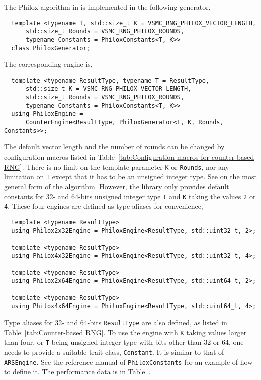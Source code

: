 The Philox algorithm in \textcite{Salmon:2011um} is implemented in the
following generator,
\begin{Verbatim}
  template <typename T, std::size_t K = VSMC_RNG_PHILOX_VECTOR_LENGTH,
      std::size_t Rounds = VSMC_RNG_PHILOX_ROUNDS,
      typename Constants = PhiloxConstants<T, K>>
  class PhiloxGenerator;
\end{Verbatim}
The corresponding \rng engine is,
\begin{Verbatim}
  template <typename ResultType, typename T = ResultType,
      std::size_t K = VSMC_RNG_PHILOX_VECTOR_LENGTH,
      std::size_t Rounds = VSMC_RNG_PHILOX_ROUNDS,
      typename Constants = PhiloxConstants<T, K>>
  using PhiloxEngine =
      CounterEngine<ResultType, PhiloxGenerator<T, K, Rounds, Constants>>;
\end{Verbatim}
The default vector length and the number of rounds can be changed by
configuration macros listed in Table~\ref{tab:Configuration macros for
  counter-based RNG}. There is no limit on the template parameter \verb|K| or
\verb|Rounds|, nor any limitation on \verb|T| except that it has to be an
unsigned integer type. See \textcite{Salmon:2011um} on the most general form of
the algorithm. However, the library only provides default constants for 32- and
64-bits unsigned integer type \verb|T| and \verb|K| taking the values \verb|2|
or \verb|4|. These four engines are defined as type aliases for convenience,
\begin{Verbatim}
  template <typename ResultType>
  using Philox2x32Engine = PhiloxEngine<ResultType, std::uint32_t, 2>;

  template <typename ResultType>
  using Philox4x32Engine = PhiloxEngine<ResultType, std::uint32_t, 4>;

  template <typename ResultType>
  using Philox2x64Engine = PhiloxEngine<ResultType, std::uint64_t, 2>;

  template <typename ResultType>
  using Philox4x64Engine = PhiloxEngine<ResultType, std::uint64_t, 4>;
\end{Verbatim}
Type aliases for 32- and 64-bits \verb|ResultType| are also defined, as listed
in Table~\ref{tab:Counter-based RNG}. To use the engine with \verb|K| taking
values larger than four, or \verb|T| being unsigned integer type with bits
other than 32 or 64, one needs to provide a suitable trait class,
\verb|Constant|. It is similar to that of \verb|ARSEngine|. See the reference
manual of \verb|PhiloxConstants| for an example of how to define it. The
performance data is in Table~.


